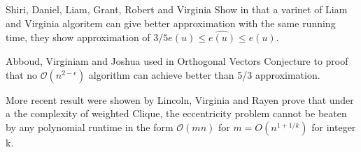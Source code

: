 Shiri, Daniel, Liam, Grant, Robert and Virginia 
Show in \cite{SDLLGREV2000} that a varinet of Liam and Virginia algoritem \cite{LV2013} can give better approximation with the same running time, they show approximation of $3/5e(u)\leq \hat{e(u)} \leq e(u)$.




Abboud, Virginiam and Joshua \cite{AVJ2016} used in Orthogonal Vectors Conjecture to proof that no $\mathcal{O}(n^{2-\epsilon})$ algorithm can achieve better than 5/3 approximation.

More recent result were showen by Lincoln, Virginia and Rayen \cite{AVR2018} prove that under a the complexity of weighted Clique, the eccentricity problem cannot be beaten by any polynomial runtime in the form $\mathcal{O}(mn)$
for $m=O(n^{1+1/k})$ for integer k.
